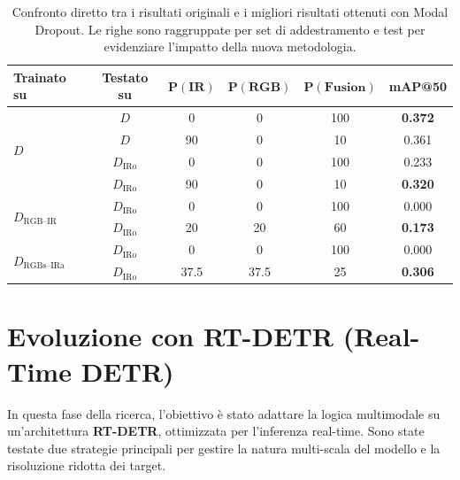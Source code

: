\documentclass[a4paper,11pt]{article}
\begin{document}
\begin{table}[h]
\centering

\caption{Confronto diretto tra i risultati originali e i migliori risultati ottenuti con Modal Dropout. Le righe sono raggruppate per set di addestramento e test per evidenziare l'impatto della nuova metodologia.}
\label{tab:summary_comparison}
\begin{tabular}{l c c c c c}
\toprule
\textbf{Trainato su} & \textbf{Testato su} & $\boldsymbol{P(\text{IR})}$ & $\boldsymbol{P(\text{RGB})}$ & $\boldsymbol{P(\text{Fusion})}$ & \textbf{mAP@50} \\
\midrule

\multirow{4}{*}{$D$} 
 & $D$ & 0 & 0 & 100 & \textbf{0.372} \\
 & $D$ & 90 & 0 & 10 & 0.361 \\
 \cmidrule(l){2-6} 
 & $D_{\text{IRo}}$ & 0 & 0 & 100 & 0.233 \\
 & $D_{\text{IRo}}$ & 90 & 0 & 10 & \textbf{0.320} \\
\midrule

\multirow{2}{*}{$D_{\text{RGB--IR}}$} 
 & $D_{\text{IRo}}$ & 0 & 0 & 100 & 0.000 \\
 & $D_{\text{IRo}}$ & 20 & 20 & 60 & \textbf{0.173} \\
\midrule

\multirow{2}{*}{$D_{\text{RGBs--IRa}}$} 
 & $D_{\text{IRo}}$ & 0 & 0 & 100 & 0.000 \\
 & $D_{\text{IRo}}$ & 37.5 & 37.5 & 25 & \textbf{0.306} \\

\bottomrule
\end{tabular}
\end{table}


\newpage
\section*{Evoluzione con RT-DETR (Real-Time DETR)}

In questa fase della ricerca, l'obiettivo è stato adattare la logica multimodale su un'architettura \textbf{RT-DETR}, ottimizzata per l'inferenza real-time. Sono state testate due strategie principali per gestire la natura multi-scala del modello e la risoluzione ridotta dei target.
\end{document}
